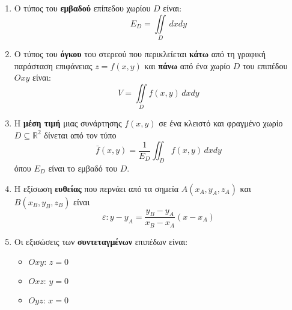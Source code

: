 \begin{enumerate}
  \item Ο τύπος του \textbf{εμβαδού} επίπεδου χωρίου $D$ είναι: 
    \[
      E_{D}=\iint\limits_{D}\,dxdy
    \]

  \item Ο τύπος του \textbf{όγκου} του στερεού που περικλείεται \textbf{κάτω} 
    από τη γραφική παράσταση επιφάνειας $z=f(x,y)$ και \textbf{πάνω} από ένα 
    χωρίο $D$ του επιπέδου $Oxy$ είναι: 
    \[
      V=\iint\limits_{D}f(x,y)\,dxdy
    \]

  \item Η \textbf{μέση τιμή} μιας συνάρτησης $ f(x,y) $ σε ένα κλειστό και 
    φραγμένο χωρίο $D\subseteq \mathbb{R}^{2}$ δίνεται από τον τύπο 
    \[
      \bar{f}(x, y) = \frac{1}{E_{D}} \iint_{D}f(x,y)\,dxdy
    \]
    όπου $ E_{D} $ είναι το εμβαδό του $D$.

  \item Η εξίσωση \textbf{ευθείας} που περνάει από τα σημεία $ A(x_{A},y_{A},z_{A}) $ 
    και $ B(x_{B},y_{B},z_{B}) $ είναι 
    \[
      \varepsilon : y - y_{A} = \frac{y_{B}-y_{A}}{x_{B}-x_{A}} (x-x_{A})
    \]

  \item Οι εξισώσεις των \textbf{συντεταγμένων} επιπέδων είναι:
    \begin{itemize}
      \item $Oxy: \, z=0$
      \item $Oxz: \, y=0$
      \item $Oyz: \, x=0$
    \end{itemize}
\end{enumerate}









